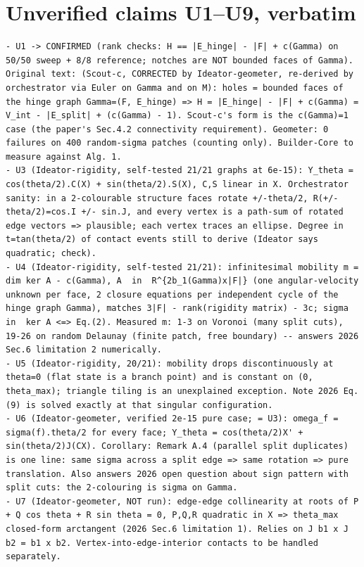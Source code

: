 \documentclass[10pt,a4paper]{article}
\begin{document}
\section{Unverified claims U1--U9, verbatim}
\begin{lstlisting}
- U1 -> CONFIRMED (rank checks: H == |E_hinge| - |F| + c(Gamma) on 50/50 sweep + 8/8 reference; notches are NOT bounded faces of Gamma). Original text: (Scout-c, CORRECTED by Ideator-geometer, re-derived by orchestrator via Euler on Gamma and on M): holes = bounded faces of the hinge graph Gamma=(F, E_hinge) => H = |E_hinge| - |F| + c(Gamma) = V_int - |E_split| + (c(Gamma) - 1). Scout-c's form is the c(Gamma)=1 case (the paper's Sec.4.2 connectivity requirement). Geometer: 0 failures on 400 random-sigma patches (counting only). Builder-Core to measure against Alg. 1.
- U3 (Ideator-rigidity, self-tested 21/21 graphs at 6e-15): Y_theta = cos(theta/2).C(X) + sin(theta/2).S(X), C,S linear in X. Orchestrator sanity: in a 2-colourable structure faces rotate +/-theta/2, R(+/-theta/2)=cos.I +/- sin.J, and every vertex is a path-sum of rotated edge vectors => plausible; each vertex traces an ellipse. Degree in t=tan(theta/2) of contact events still to derive (Ideator says quadratic; check).
- U4 (Ideator-rigidity, self-tested 21/21): infinitesimal mobility m = dim ker A - c(Gamma), A  in  R^{2b_1(Gamma)x|F|} (one angular-velocity unknown per face, 2 closure equations per independent cycle of the hinge graph Gamma), matches 3|F| - rank(rigidity matrix) - 3c; sigma  in  ker A <=> Eq.(2). Measured m: 1-3 on Voronoi (many split cuts), 19-26 on random Delaunay (finite patch, free boundary) -- answers 2026 Sec.6 limitation 2 numerically.
- U5 (Ideator-rigidity, 20/21): mobility drops discontinuously at theta=0 (flat state is a branch point) and is constant on (0, theta_max); triangle tiling is an unexplained exception. Note 2026 Eq.(9) is solved exactly at that singular configuration.
- U6 (Ideator-geometer, verified 2e-15 pure case; = U3): omega_f = sigma(f).theta/2 for every face; Y_theta = cos(theta/2)X' + sin(theta/2)J(CX). Corollary: Remark A.4 (parallel split duplicates) is one line: same sigma across a split edge => same rotation => pure translation. Also answers 2026 open question about sign pattern with split cuts: the 2-colouring is sigma on Gamma.
- U7 (Ideator-geometer, NOT run): edge-edge collinearity at roots of P + Q cos theta + R sin theta = 0, P,Q,R quadratic in X => theta_max closed-form arctangent (2026 Sec.6 limitation 1). Relies on J b1 x J b2 = b1 x b2. Vertex-into-edge-interior contacts to be handled separately.

\end{lstlisting}
\end{document}
